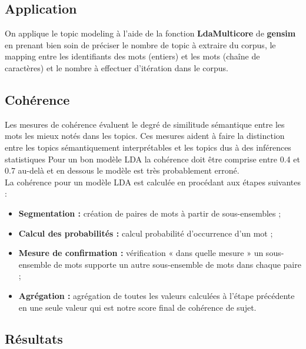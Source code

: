 \documentclass[a4paper,french,12pt]{article}
\begin{document}
\subsection{Application}

On applique le topic modeling à l'aide de la fonction \textbf{LdaMulticore} de \textbf{gensim} en prenant bien soin de préciser le nombre de topic à extraire du corpus, le mapping entre les identifiants des mots (entiers) et les mots (chaîne de caractères) et le nombre à effectuer d'itération dans le corpus.

\subsection{Cohérence}

Les mesures de cohérence évaluent le degré de similitude sémantique entre les mots les mieux notés dans les topics. Ces mesures aident à faire la distinction entre les topics sémantiquement interprétables et les topics dus à des inférences statistiques
Pour un bon modèle LDA la cohérence doit être comprise entre 0.4 et 0.7 au-delà et en dessous le modèle est très probablement erroné.\\

\noindent
La cohérence pour un modèle LDA est calculée en procédant aux étapes suivantes :\\

\begin{itemize}
    \item \textbf{Segmentation :} création de paires de mots à partir de sous-ensembles ;\\
    \item \textbf{Calcul des probabilités :} calcul probabilité d'occurrence d'un mot ;\\
    \item \textbf{Mesure de confirmation :} vérification « dans quelle mesure » un sous-ensemble de mots supporte un autre sous-ensemble de mots dans chaque paire ;\\
    \item \textbf{Agrégation :} agrégation de toutes les valeurs calculées à l'étape précédente en une seule valeur qui est notre score final de cohérence de sujet.
\end{itemize}

\newpage

\subsection{Résultats}
\end{document}
